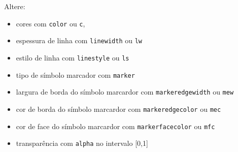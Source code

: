 \documentclass[11pt]{article}
\providecommand{\tightlist}{%
      \setlength{\itemsep}{0pt}\setlength{\parskip}{0pt}}
\begin{document}
    Altere:

\begin{itemize}
\tightlist
\item
  cores com \texttt{color} ou \texttt{c},
\item
  espessura de linha com \texttt{linewidth} ou \texttt{lw}
\item
  estilo de linha com \texttt{linestyle} ou \texttt{ls}
\item
  tipo de símbolo marcador com \texttt{marker}
\item
  largura de borda do símbolo marcardor com \texttt{markeredgewidth} ou
  \texttt{mew}
\item
  cor de borda do símbolo marcardor com \texttt{markeredgecolor} ou
  \texttt{mec}
\item
  cor de face do símbolo marcardor com \texttt{markerfacecolor} ou
  \texttt{mfc}
\item
  transparência com \texttt{alpha} no intervalo {[}0,1{]}
\end{itemize}
\end{document}
